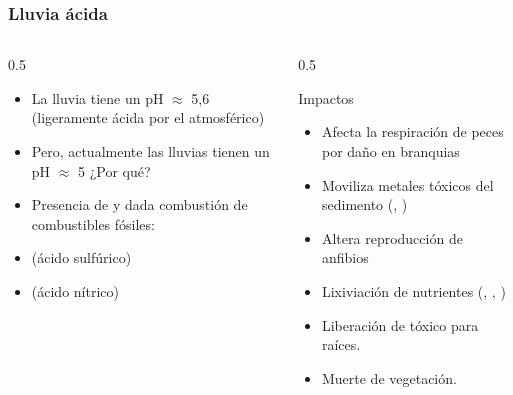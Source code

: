 \documentclass[11pt, aspectratio=169, xcolor=table]{beamer}
\begin{document}
\begin{frame}
  \frametitle{Lluvia ácida}
  \begin{columns}
    \begin{column}{0.5\textwidth}
      \begin{itemize}
        \item La lluvia tiene un pH $\approx$ 5,6 (ligeramente ácida por el  atmosférico)
        \item Pero, actualmente las lluvias tienen un pH $\approx$ 5 ¿Por qué?
        \item Presencia de  y  dada combustión de combustibles fósiles:
        \item {} (ácido sulfúrico)
        \item {} (ácido nítrico)
      \end{itemize}
    \end{column}
    \begin{column}{0.5\textwidth}
      \begin{block}{Impactos}
        \begin{itemize}
          \item Afecta la respiración de peces por daño en branquias
          \item Moviliza metales tóxicos del sedimento (, )
          \item Altera reproducción de anfibios
          \item Lixiviación de nutrientes (, , )
          \item Liberación de  tóxico para raíces.
          \item Muerte de vegetación.
        \end{itemize}
      \end{block}
    \end{column}
  \end{columns}
\end{frame}
\end{document}
